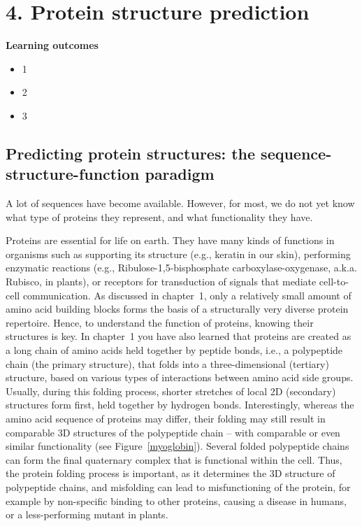 \section{4. Protein structure prediction}

\begin{framed}
\textbf{Learning outcomes}\\
\begin{itemize}
\item 1
\item 2
\item 3
\end{itemize}
\end{framed}

\subsection{Predicting protein structures: the sequence-structure-function paradigm}

A lot of sequences have become available.
However, for most, we do not yet know what type of proteins they represent, and what functionality they have.

Proteins are essential for life on earth.
They have many kinds of functions in organisms such as supporting its structure (e.g., keratin in our skin), performing enzymatic reactions (e.g., Ribulose-1,5-bisphosphate carboxylase-oxygenase, a.k.a. Rubisco, in plants), or receptors for transduction of signals that mediate cell-to-cell communication.
As discussed in chapter~1, only a relatively small amount of amino acid building blocks forms the basis of a structurally very diverse protein repertoire.
Hence, to understand the function of proteins, knowing their structures is key. In chapter~1 you have also learned that proteins are created as a long chain of amino acids held together by peptide bonds, i.e., a polypeptide chain (the primary structure), that folds into a three-dimensional (tertiary) structure, based on various types of interactions between amino acid side groups.
Usually, during this folding process, shorter stretches of local 2D (secondary) structures form first, held together by hydrogen bonds.
Interestingly, whereas the amino acid sequence of proteins may differ, their folding may still result in comparable 3D structures of the polypeptide chain -- with comparable or even similar functionality (see Figure~\ref{myoglobin}).
Several folded polypeptide chains can form the final quaternary complex that is functional within the cell.
Thus, the protein folding process is important, as it determines the 3D structure of polypeptide chains, and misfolding can lead to misfunctioning of the protein, for example by non-specific binding to other proteins, causing a disease in humans, or a less-performing mutant in plants.

